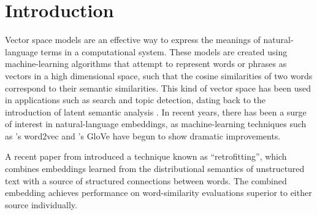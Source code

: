 \documentclass[letterpaper]{article}
\title{\thetitle}
\begin{document}
\maketitle
\begin{abstract}

A currently successful approach to computationally represent the meanings of
words is to represent them as vectors (embeddings) in a machine-learned vector
space. These embeddings are often evaluated on their ability to identify
similar or related words like a human would. In this paper, we show the
effectiveness of combining existing embeddings learned by GloVe
\cite{pennington2014glove} with structured knowledge from the semantic network
ConceptNet 5 \cite{speer2012conceptnet}, taking care to merge them into a
common word representation. The resulting vector space has a larger vocabulary
than either source, can represent word meanings in multiple languages, and
achieves state-of-the-art performance on word similarity evaluations.
Its score of $\rho = \scoreRW{}$ on an evaluation of rare words
\cite{luong2013rw} is 13.6\% higher than the previous best known system.

\end{abstract}

\section{Introduction}

Vector space models are an effective way to express the meanings of
natural-language terms in a computational system. These models are created
using machine-learning algorithms that attempt to represent words or phrases as
vectors in a high dimensional space, such that the cosine similarities of two
words correspond to their semantic similarities. This kind of vector space has
been used in applications such as search and topic detection, dating back to
the introduction of latent semantic analysis \cite{deerwester1990indexing}.  In
recent years, there has been a surge of interest in natural-language
embeddings, as machine-learning techniques such as
's word2vec and 's
GloVe have begun to show dramatic improvements.

A recent paper from  introduced a technique
known as ``retrofitting'', which combines embeddings learned from the
distributional semantics of unstructured text with a source of structured
connections between words. The combined embedding achieves performance on
word-similarity evaluations superior to either source individually.
\end{document}
